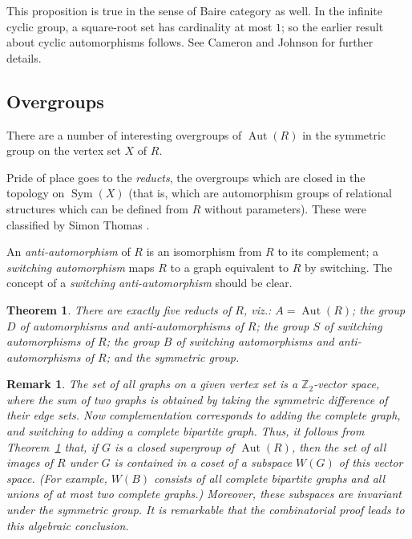 \documentclass{book}
\newtheorem{theorem}{Theorem}
\newtheorem{remark}{Remark}
\DeclareMathOperator{\Sym}{Sym}
\DeclareMathOperator{\Aut}{Aut}
\begin{document}
This proposition is true in the sense of Baire category as well. In
the infinite cyclic group, a square-root set has cardinality at most
$1$; so the earlier result about cyclic automorphisms follows. See
Cameron and Johnson \cite{ch32:bib9} for further details.

\subsection{Overgroups}

There are a number of interesting overgroups of $\Aut(R)$ in the symmetric
group on the vertex set $X$ of $R$.

Pride of place goes to the \emph{reducts}, the overgroups which are closed
in the topology on $\Sym(X)$ (that is, which are automorphism groups of
relational structures which can be defined from $R$ without parameters).
These were classified by Simon Thomas \cite{ch32:bib50}.

An \emph{anti-automorphism}
of $R$ is an isomorphism from $R$ to its complement; a
\emph{switching automorphism} maps $R$ to a graph equivalent to
$R$ by switching. The concept of a \emph{switching
anti-automorphism} should be clear.

\begin{theorem}\label{ch32:them8.3} 
There are exactly five reducts of $R$, viz.: $A = \Aut(R)$; the
group $D$ of automorphisms and anti-automorphisms of $R$; the group
$S$ of switching automorphisms of $R$; the group $B$ of switching
automorphisms and anti-automorphisms of $R$; and the symmetric
group.
\end{theorem}

\begin{remark}\label{ch32:rema8.1}\rm
The set of all graphs on a given vertex set is
a $\mathbb{Z}_2$-vector space, where the sum of two graphs is
obtained by taking the symmetric difference of their edge sets. Now
complementation corresponds to adding the complete graph, and
switching to adding a complete bipartite graph. Thus, it follows
from Theorem~\ref{ch32:them8.3} that, if $G$ is a closed supergroup
of $\Aut(R)$, then the set of all images of $R$ under $G$ is
contained in a coset of a subspace $W(G)$ of this vector space. (For
example, $W(B)$ consists of all complete bipartite graphs and all
unions of at most two complete graphs.) Moreover, these subspaces
are invariant under the symmetric group. It is remarkable that the
combinatorial proof leads to this algebraic conclusion.
\end{remark}
\end{document}
